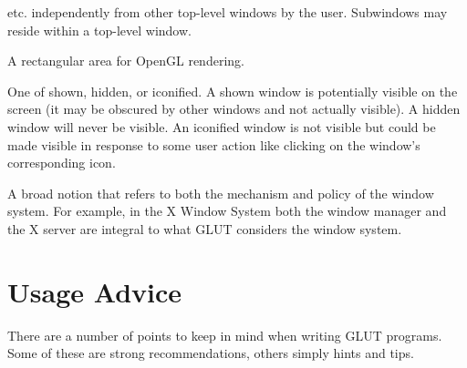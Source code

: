 \documentclass[titlepage,twoside]{article}
\begin{document}
\begin{description}
etc. independently from other top-level windows by the user.
Subwindows may reside within a top-level window.
\item[{\em \ndx{Window}}]  A rectangular area for OpenGL rendering.
\item[{\em \ndx{Window display state}}]  One of shown, hidden, or iconified.
A shown window is potentially visible on the screen (it may be obscured
by other windows and not actually visible).  A hidden window will
never be visible.  An iconified window is not visible but could
be made visible in response to some user action like clicking on the
window's corresponding icon.
\item[{\em \ndx{Window system}}]  A broad notion 
that refers to both the mechanism and policy of the window system.
For example, in the X Window System both the window manager and the
X server are integral to what GLUT considers the window system.
\end{description}



\section{Usage Advice}

There are a number of points to keep in mind when writing GLUT
programs.  Some of these are strong recommendations, others simply
hints and tips.
\end{document}
